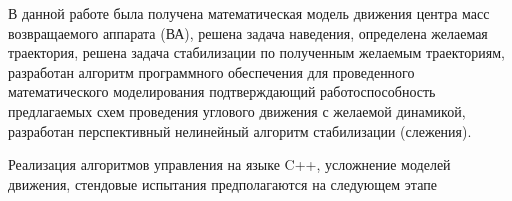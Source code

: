 В данной работе была получена математическая модель движения центра масс возвращаемого аппарата (ВА), решена задача наведения, определена желаемая траектория, решена задача стабилизации по полученным желаемым траекториям, разработан алгоритм программного обеспечения  для проведенного математического моделирования подтверждающий работоспособность предлагаемых схем проведения углового движения с желаемой динамикой, разработан перспективный нелинейный алгоритм стабилизации (слежения).

Реализация алгоритмов управления на языке C++, усложнение моделей движения, стендовые испытания предполагаются на следующем этапе
\clearpage
